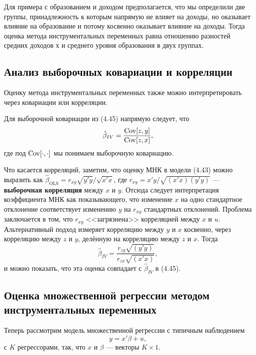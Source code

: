Для примера с образованием и доходом предполагается, что мы определили две группы, принадлежность к которым напрямую не влияет на доходы, но оказывает влияние на образование и потому косвенно оказывает влияние на доходы. Тогда оценка метода инструментальных переменных равна отношению разностей средних доходов х и среднего уровня образования в двух группах.

\subsection{Анализ выборочных ковариации и корреляции}
Оценку метода инструментальных переменных также можно интерпретировать через ковариации или корреляции. 

Для выборочной ковариации из (4.45) напрямую следует, что 
\begin{equation}
\hat{\beta}_{IV} = \frac{\mathrm{Cov}[z,y]}{\mathrm{Cov}[z,x]},
\end{equation}
где под $\mathrm{Cov}[\cdot,\cdot]$ мы понимаем выборочную ковариацию.

Что касается корреляций, заметим, что оценку МНК в модели (4.43) можно выразить как $\hat{\beta}_{\text{OLS}} = r_{xy}\sqrt{y'y}/\sqrt{x'x}$, где $r_{xy} = x'y/\sqrt{(x'x)(y'y)}$ --- \textbf{выборочная корреляция} между $x$ и $y$.  Отсюда следует интерпретация коэффициента МНК как показывающего, что изменение $x$ на одно стандартное отклонение соответствует изменению $y$ на $r_{xy}$ стандартных отклонений. Проблема заключается в том, что $r_{xy}$ <<загрязнена>> корреляцией между $x$ и $u$. Альтернативный подход измеряет корреляцию между $y$ и $x$ косвенно, через корреляцию между $z$ и $y$, делённую на корреляцию между $z$ и $x$.  Тогда
\begin{equation}
\hat{\beta}_{IV} = \frac{r_{zy}\sqrt{(y'y)}}{r_{zx}\sqrt{(x'x)}},
\end{equation}
и можно показать, что эта оценка совпадает с $\hat{\beta}_{IV}$ в (4.45).

\subsection{Оценка множественной регрессии методом инструментальных переменных}

Теперь рассмотрим модель множественной регрессии с типичным наблюдением 
$$ y =x'\beta +u,$$
с $K$ регрессорами, так, что $x$ и $\beta$ --- векторы $K \times 1$.

